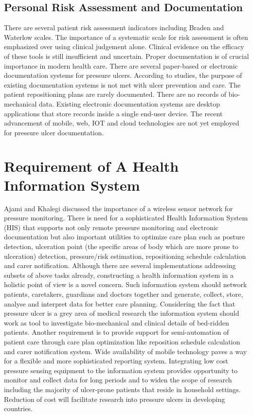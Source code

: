\subsection{Personal Risk Assessment and Documentation}
There are several patient risk assessment indicators including Braden and Waterlow scales. The importance of a systematic scale for risk assessment is often emphasized over using clinical judgement alone. Clinical evidence on the efficacy of these tools is still insufficient and uncertain.
Proper documentation is of crucial importance in modern health care. There are several paper-based or electronic documentation systems for pressure ulcers. According to studies, the purpose of existing documentation systems is not met with ulcer prevention and care. The patient repositioning plans are rarely documented. There are no records of bio-mechanical data. Existing electronic documentation systems are desktop applications that store records inside a single end-user device. The recent advancement of mobile, web, IOT and cloud technologies are not yet employed for pressure ulcer documentation. 

\section{Requirement of A Health Information System}
Ajami and Khalegi discussed the importance of a wireless sensor network for pressure monitoring. There is need for a sophisticated Health Information System (HIS) that supports not only remote pressure monitoring and electronic documentation but also important utilities to optimize care plan such as posture detection, ulceration point (the specific areas of body which are more prone to ulceration) detection, pressure/risk estimation, repositioning schedule calculation and carer notification. Although there are several implementations addressing subsets of above tasks already, constructing a health information system in a holistic point of view is a novel concern. Such information system should network patients, caretakers, guardians and doctors together and generate, collect, store, analyse and interpret data for better care planning. Considering the fact that pressure ulcer is a grey area of medical research the information system should work as tool to investigate bio-mechanical and clinical details of bed-ridden patients. Another requirement is to provide support for semi-automation of patient care through care plan optimization like reposition schedule calculation and carer notification system. Wide availability of mobile technology paves a way for a flexible and more sophisticated reporting system. Integrating low cost pressure sensing equipment to the information system provides opportunity to monitor and collect data for long periods and to widen the scope of research including the majority of ulcer-prone patients that reside in household settings. Reduction of cost will facilitate research into pressure ulcers in developing countries.

